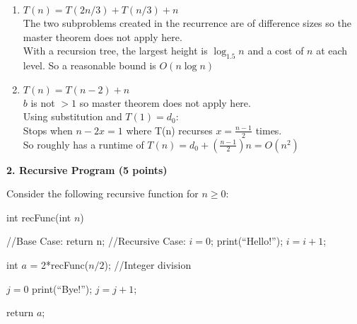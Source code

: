\documentclass[12pt]{elsart}
\begin{document}
\begin{enumerate}
\newpage
   
   \item   $T(n) = T(2n/3) + T(n/3) + n$\\
   The two subproblems created in the recurrence are of difference sizes so the master theorem does not apply here.\\
   With a recursion tree, the largest height is $\log_{1.5} n$ and a cost of $n$ at each level. So a reasonable bound is $O(n\log n)$
   
   \item   $T(n) = T(n-2) + n$\\
   $b$ is not $> 1$ so master theorem does not apply here.\\
   Using substitution and $T(1) = d_0$:\\
   Stops when $n - 2x = 1$ where T(n) recurses $x = \frac{n - 1}{2}$ times.\\
   So roughly has a runtime of $T(n) = d_0 + (\frac{n - 1}{2})n = O(n^2)$
\end{enumerate}

{\bf 2. Recursive Program (5 points)}

Consider the following recursive function for $n \geq 0$:

\begin{algorithm}
\caption{int recFunc(int $n$)}
 \begin{algorithmic}
 \State //Base Case:
    \State return n;
 \EndIf
 \State //Recursive Case:
 \State $i = 0$;
    \State print(``Hello!'');
    \State $i = i + 1$;
  \EndWhile

  \State int $a$ = 2*recFunc($n/2$); //Integer division

    \State $j = 0$
    \State print(``Bye!'');
    \State $j = j + 1$;
  \EndWhile

 \State return $a$;

\end{algorithmic}
\end{algorithm}
\end{document}
